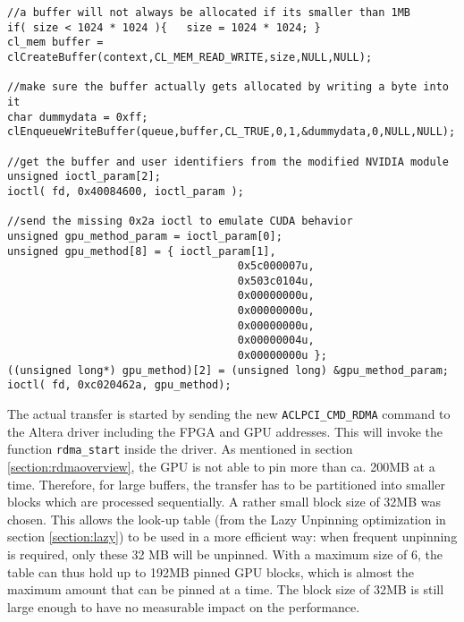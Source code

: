 \begin{lstlisting}[label=pinnable_cl_buffer, caption=Creating a pinnable buffer in OpenCL]
//a buffer will not always be allocated if its smaller than 1MB
if( size < 1024 * 1024 ){	size = 1024 * 1024;	}
cl_mem buffer = clCreateBuffer(context,CL_MEM_READ_WRITE,size,NULL,NULL);

//make sure the buffer actually gets allocated by writing a byte into it
char dummydata = 0xff;
clEnqueueWriteBuffer(queue,buffer,CL_TRUE,0,1,&dummydata,0,NULL,NULL);

//get the buffer and user identifiers from the modified NVIDIA module
unsigned ioctl_param[2];
ioctl( fd, 0x40084600, ioctl_param );

//send the missing 0x2a ioctl to emulate CUDA behavior
unsigned gpu_method_param = ioctl_param[0];
unsigned gpu_method[8] = { ioctl_param[1],
                                    0x5c000007u,
                                    0x503c0104u,
                                    0x00000000u,
                                    0x00000000u,
                                    0x00000000u,
                                    0x00000004u,
                                    0x00000000u };
((unsigned long*) gpu_method)[2] = (unsigned long) &gpu_method_param;
ioctl( fd, 0xc020462a, gpu_method);
\end{lstlisting}










The actual transfer is started by sending the new \texttt{ACLPCI\_CMD\_RDMA} command to the Altera driver including the FPGA and GPU addresses.
This will invoke the function \texttt{rdma\_start} inside the driver.
As mentioned in section \ref{section:rdmaoverview}, the GPU is not able to pin more than ca. 200MB at a time.
Therefore, for large buffers, the transfer has to be partitioned into smaller blocks which are processed sequentially.
A rather small block size of 32MB was chosen.
This allows the look-up table (from the Lazy Unpinning optimization in section \ref{section:lazy}) to be used in a more efficient way: when frequent unpinning is required, only these 32 MB will be unpinned.
With a maximum size of 6, the table can thus hold up to 192MB pinned GPU blocks, which is almost the maximum amount that can be pinned at a time.
The block size of 32MB is still large enough to have no measurable impact on the performance.

